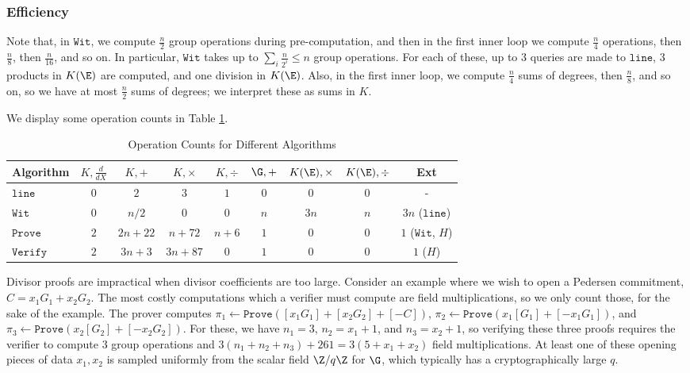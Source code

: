 \documentclass[11pt,letterpaper]{article}
\theoremstyle{definition}
\newcommand{\6}{\mathbf}
\newcommand{\7}{\mathcal}
\begin{document}
\subsubsection{Efficiency}\label{sec:efficiency}


Note that, in $\texttt{Wit}$, we compute $\frac{n}{2}$ group operations during pre-computation, and then in the first inner loop we compute $\frac{n}{4}$ operations, then $\frac{n}{8}$, then $\frac{n}{16}$, and so on. In particular, $\texttt{Wit}$ takes up to $\sum_i \frac{n}{2^i} \leq n$ group operations. For each of these, up to $3$ queries are made to $\texttt{line}$, $3$ products in $K(\E)$ are computed, and one division in $K(\E)$. Also, in the first inner loop, we compute $\frac{n}{4}$ sums of degrees, then $\frac{n}{8}$, and so on, so we have at most $\frac{n}{2}$ sums of degrees; we interpret these as sums in $K$. 


We display some operation counts in Table \ref{tab:operation-counts}. 

\begin{table}[h!]
\centering
\caption{Operation Counts for Different Algorithms}
\begin{tabular}{|l|c|c|c|c|c|c|c|c|} \hline
Algorithm & $K,\frac{d}{dX}$ & $K,+$ & $K,\times$ & $K,\div$ & $\G,+$ & $K(\E), \times$ & $K(\E),\div$ & Ext \\ \hline
$\texttt{line}$ & $0$ & $2$ & $3$ & $1$ & $0$ & $0$ & $0$ & - \\ \hline
$\texttt{Wit}$ & $0$ & $n/2$ & $0$ & $0$ & $n$ & $3n$  & $n$ &  $3n$ ($\texttt{line}$)\\ \hline
$\texttt{Prove}$ & $2$ & $2n+22$ & $n+72$ & $n+6$ &  $1$ & $0$  & $0$ & $1$ ($\texttt{Wit}$, $H$)\\ \hline
$\texttt{Verify}$ & $2$ & $3n+3$ & $3n+87$ & $0$ & $1$ & $0$ & $0$ & $1$ ($H$) \\ \hline
\end{tabular}
\label{tab:operation-counts}
\end{table}

Divisor proofs are impractical when divisor coefficients are too large. Consider an example where we wish to open a Pedersen commitment, $C = x_1 G_1 + x_2 G_2$. The most costly computations which a verifier must compute are field multiplications, so we only count those, for the sake of the example. The prover computes $\pi_1 \leftarrow \texttt{Prove}([x_1 G_1] + [x_2 G_2] + [-C])$, $\pi_2 \leftarrow \texttt{Prove}(x_1[G_1] + [-x_1G_1])$, and $\pi_3 \leftarrow \texttt{Prove}(x_2[G_2] + [-x_2G_2])$. For these, we have $n_1 = 3$, $n_2 = x_1 + 1$, and $n_3 = x_2 + 1$, so verifying these three proofs requires the verifier to compute $3$ group operations and $3(n_1 + n_2 + n_3) + 261 = 3(5 + x_1 + x_2)$ field multiplications. At least one of these opening pieces of data $x_1, x_2$ is sampled uniformly from the scalar field $\Z/q\Z$ for $\G$, which typically has a cryptographically large $q$.
\end{document}

